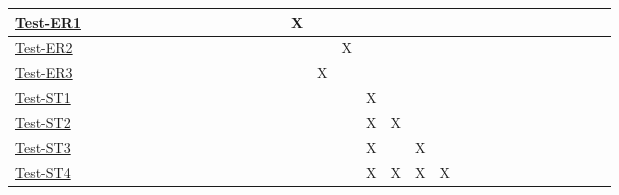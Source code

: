 \documentclass[12pt, titlepage]{article}
\begin{document}
\begin{landscape}
\begin{table}[H]
\begin{adjustwidth}{-0.1in}{-1in}
{\begin{tabular}{c|c|c|c|c|c|c|c|c|c|c|c|c|c|c|c|c|l|l|l|l|l|l|l|l|l|l|l|l|l|l|l|l|}
\multicolumn{1}{|l|}{\hyperref[itm:Test-ER1]{Test-ER1}}   &             &             &             &              &             &              &              &             &              &              &             &              &              &             &        X      &                & & & & & \\ \hline
\multicolumn{1}{|l|}{\hyperref[itm:Test-ER2]{Test-ER2}}   &             &             &             &              &             &             &             &             &              &              &              &              &              &              &              &               & X& & & & \\ \hline
\multicolumn{1}{|l|}{\hyperref[itm:Test-ER3]{Test-ER3}}   &              &             &             &              &              &              &              &             &             &             &              &              &             &             &             &         X       & & & & & \\ \hline
\multicolumn{1}{|l|}{\hyperref[itm:Test-ST1]{Test-ST1}}   &             &             &             &              &              &              &              &             &              &              &              &              &              &              &              &             &        &   X  &   & & \\ \hline
\multicolumn{1}{|l|}{\hyperref[itm:Test-ST2]{Test-ST2}}   &              &              &              &              &              &              &              &             &             &             &              &              &              &              &              &             &         &X &X & &\\ \hline
\multicolumn{1}{|l|}{\hyperref[itm:Test-ST3]{Test-ST3}}   &             &              &             &              &              &              &              &             &              &              &              &              &              &              &              &             &      & X& & X&\\ \hline
\multicolumn{1}{|l|}{\hyperref[itm:Test-ST4]{Test-ST4}}   &             &             &             &             &             &             &             &             &              &              &             &             &              &             &              &                 &         &X &X & X&X\\ \hline
\end{tabular}

}
\end{adjustwidth}
\end{table}
\end{landscape}
\end{document}
